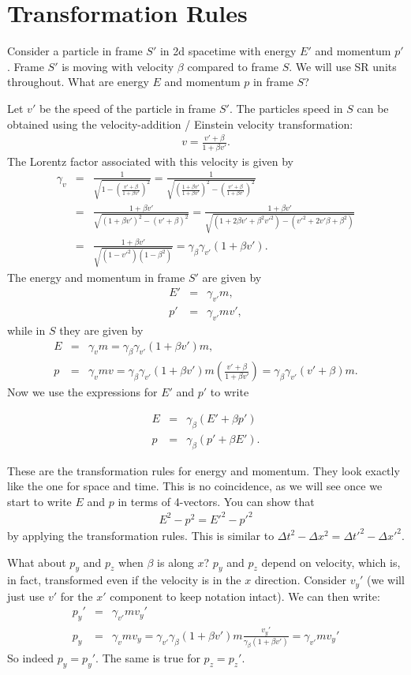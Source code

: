 \documentclass[12pt]{article}
\newcommand{\be}{\begin{eqnarray}}
\newcommand{\ee}{\end{eqnarray}}
\newif\ifshowboardquestion
\begin{document}
\section{Transformation Rules}

Consider a particle in frame $S'$ in 2d spacetime with energy $E'$ and momentum $p'$. Frame $S'$ is moving with velocity $\beta$ compared to frame $S$. We will use SR units throughout. What are energy $E$ and momentum $p$ in frame $S$?

Let $v'$ be the speed of the particle in frame $S'$. The particles speed in $S$ can be obtained using the velocity-addition / Einstein velocity transformation:
\be
v = \frac{v' + \beta}{1+\beta v'}.
\ee
The Lorentz factor associated with this velocity is given by
\be
\gamma_v &=& \frac{1}{\sqrt{1-\left(\frac{v' + \beta}{1+\beta v'}\right)^2}} = \frac{1}{\sqrt{\left(\frac{1+\beta v'}{1+\beta v'}\right)^2-\left(\frac{v' + \beta}{1+\beta v'}\right)^2}} \nonumber \\
&=& \frac{1+\beta v'}{\sqrt{(1+\beta v')^2 -(v'+\beta)^2}} =  \frac{1+\beta v'}{\sqrt{(1 + 2 \beta v'+ \beta^2 v'^2)-(v'^2+2v'\beta + \beta^2)}}\nonumber \\
&=& \frac{1+\beta v'}{\sqrt{(1-v'^2)(1-\beta^2)}} = \gamma_{\beta} \gamma_{v'} (1+\beta v'). 
\ee
The energy and momentum in frame $S'$ are given by 
\be
E' &=& \gamma_{v'} m,\nonumber \\
p' &=& \gamma_{v'} m v',
\ee
while in $S$ they are given by 
\be
E &=& \gamma_v m =  \gamma_\beta \gamma_{v'} (1 + \beta v') m, \nonumber \\ 
p &=& \gamma_v m v = \gamma_\beta \gamma_{v'} (1 + \beta v') m \left(\frac{v'+\beta}{1+\beta v'}\right)  = \gamma_\beta \gamma_{v'} (v' + \beta) m.
\ee
Now we use the expressions for $E'$ and $p'$ to write
\begin{tcolorbox}[colback=blue!5!white]
\vspace{-1.3em}
\be
E &=& \gamma_\beta (E'+\beta p') \\
p &=& \gamma_\beta(p' +\beta E').
\ee
\end{tcolorbox}
These are the transformation rules for energy and momentum.  They look exactly like the one for space and time. This is no coincidence, as we will see once we start to write $E$ and $p$ in terms of 4-vectors. You can show that 
\be
E^2 - p^2 = E'^2-p'^2
\ee
by applying the transformation rules. This is similar to $\Delta t^2 -\Delta x^2  = \Delta t'^2 -\Delta x'^2$. 

What about $p_y$ and $p_z$ when $\beta$ is along $x$? $p_y$ and $p_z$ depend on velocity, which is, in fact, transformed even if the velocity is in the $x$ direction. Consider $v_y'$ (we will just use $v'$ for the $x'$ component to keep notation intact). We can then write:
\be
p_y' &=& \gamma_{v'} m v_y'  \\
p_y  &=& \gamma_{v} m v_y = \gamma_{v'} \gamma_{\beta} (1+\beta v') m \frac{v_y'}{\gamma_{\beta}(1+\beta v')} = \gamma_{v'} m v_y'
\ee
So indeed $p_y = p_{y}'$. The same is true for $p_z = p_{z}'$.
\ifshowboardquestion
\end{document}
